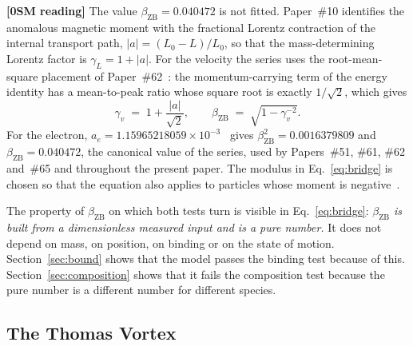 \documentclass[%
 reprint, amsmath,amssymb, aps, prb, ]{revtex4-2}
\numberwithin{equation}{section}
\newcommand{\betaZB}{\beta_{\text{ZB}}}
\newcommand{\gv}{\gamma_v}
\begin{document}
\textbf{[0SM reading]} The value $\betaZB = 0.040472$ is not fitted. Paper~\#10 identifies the anomalous magnetic moment with the fractional Lorentz contraction of the internal transport path, $\lvert a\rvert = (L_0 - L)/L_0$, so that the mass-determining Lorentz factor is $\gamma_L = 1 + \lvert a\rvert$. For the velocity the series uses the root-mean-square placement of Paper~\#62~\cite{hanamura62}: the momentum-carrying term of the energy identity has a mean-to-peak ratio whose square root is exactly $1/\sqrt{2}$, which gives
\begin{equation}
\gv \;=\; 1 + \frac{\lvert a\rvert}{\sqrt{2}},
\qquad
\betaZB \;=\; \sqrt{1 - \gv^{-2}} .
\label{eq:bridge}
\end{equation}
For the electron, $a_e = 1.15965218059\times10^{-3}$~\cite{fan2023} gives $\betaZB^{2} = 0.0016379809$ and $\betaZB = 0.040472$, the canonical value of the series, used by Papers~\#51, \#61, \#62 and~\#65 and throughout the present paper. The modulus in Eq.~\eqref{eq:bridge} is chosen so that the equation also applies to particles whose moment is negative~\cite{hanamura62}.

The property of $\betaZB$ on which both tests turn is visible in Eq.~\eqref{eq:bridge}: \emph{$\betaZB$ is built from a dimensionless measured input and is a pure number.} It does not depend on mass, on position, on binding or on the state of motion. Section~\ref{sec:bound} shows that the model passes the binding test because of this. Section~\ref{sec:composition} shows that it fails the composition test because the pure number is a different number for different species.

\subsection{The Thomas Vortex}
\label{subsec:primer_omt}
\end{document}
